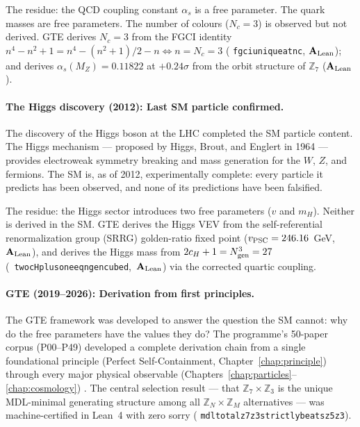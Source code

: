 \documentclass[11pt,openany]{book}
\theoremstyle{remark}
\newcommand{\lean}[1]{%
  \penalty-100
  \begingroup\def\_{\textunderscore\allowbreak}\texttt{#1}\endgroup}
\newcommand{\CatAL}{\ensuremath{\textbf{A}_{\rm Lean}}}
\begin{document}
The residue: the QCD coupling constant $\alpha_s$ is a free parameter.
The quark masses are free parameters.
The number of colours ($N_c = 3$) is observed but not derived.
GTE derives $N_c = 3$ from the FGCI identity
$n^4 - n^2 + 1 = n^4 - (n^2+1)/2 - n \Leftrightarrow n = N_c = 3$
(\lean{fgci\_unique\_at\_nc}, \CatAL);
and derives $\alpha_s(M_Z) = 0.11822$ at $+0.24\sigma$ from the orbit structure of
$\mathbb{Z}_7$ (\CatAL).

\paragraph{The Higgs discovery (2012): Last SM particle confirmed.}
The discovery of the Higgs boson at the LHC completed the SM particle content.
The Higgs mechanism --- proposed by Higgs, Brout, and Englert in 1964 --- provides
electroweak symmetry breaking and mass generation for the $W$, $Z$, and fermions.
The SM is, as of 2012, experimentally complete: every particle it predicts has been
observed, and none of its predictions have been falsified.

The residue: the Higgs sector introduces two free parameters ($v$ and $m_H$).
Neither is derived in the SM.
GTE derives the Higgs VEV from the self-referential renormalization group (SRRG)
\cite{SpivackSRRG} golden-ratio fixed point ($v_{\rm PSC} = 246.16$~GeV, \CatAL), and derives the
Higgs mass from $2c_H + 1 = N_{\rm gen}^3 = 27$ \mbox{(\lean{two\_cH\_plus\_one\_eq\_ngen\_cubed}, \CatAL)} via the corrected quartic coupling.

\paragraph{GTE (2019--2026): Derivation from first principles.}
The GTE framework was developed to answer the question the SM cannot: why do the
free parameters have the values they do?
The programme's 50-paper corpus (P00--P49) developed a complete derivation chain from
a single foundational principle (Perfect Self-Containment, Chapter~\ref{chap:principle})
through every major physical observable (Chapters~\ref{chap:particles}--\ref{chap:cosmology})
\cite{SpivackSM,SpivackGTEUnification,SpivackCompleteness,SpivackThreeTapeCMCA,SpivackGTEPolynomialUFT,SpivackGTECosmology}.
The central selection result --- that $\mathbb{Z}_7\times\mathbb{Z}_3$ is the unique
MDL-minimal generating structure among all $\mathbb{Z}_N\times\mathbb{Z}_M$
alternatives --- was machine-certified in Lean~4 with zero sorry
(\lean{mdl\_total\_z7z3\_strictly\_beats\_z5z3}).
\end{document}

